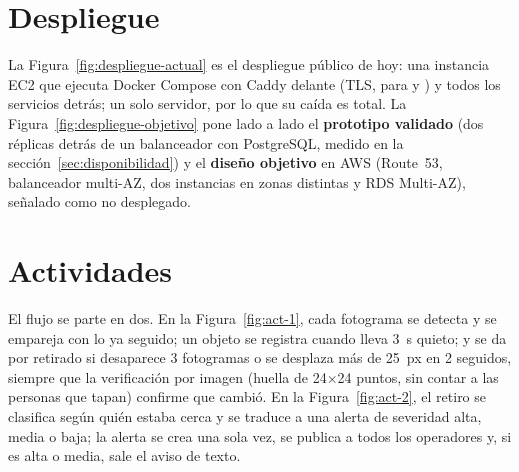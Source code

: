
\section{Despliegue}
La Figura~\ref{fig:despliegue-actual} es el despliegue público de hoy: una instancia EC2 que ejecuta Docker Compose con Caddy delante (TLS,
 para  y ) y todos los servicios detrás; un solo servidor, por lo que su caída es total. La
Figura~\ref{fig:despliegue-objetivo} pone lado a lado el \textbf{prototipo validado} (dos réplicas detrás de un balanceador con PostgreSQL, medido en
la sección~\ref{sec:disponibilidad}) y el \textbf{diseño objetivo} en AWS (Route~53, balanceador multi-AZ, dos instancias en zonas distintas y RDS
Multi-AZ), señalado como no desplegado.


\section{Actividades}
El flujo se parte en dos. En la Figura~\ref{fig:act-1}, cada fotograma se detecta y se empareja con lo ya seguido; un objeto se registra cuando lleva 3~s
quieto; y se da por retirado si desaparece 3 fotogramas o se desplaza más de 25~px en 2 seguidos, siempre que la verificación por imagen
(huella de 24$\times$24 puntos, sin contar a las personas que tapan) confirme que cambió. En la Figura~\ref{fig:act-2}, el retiro se clasifica
según quién estaba cerca y se traduce a una alerta de severidad alta, media o baja; la alerta se crea una sola vez, se publica a todos los
operadores y, si es alta o media, sale el aviso de texto.

